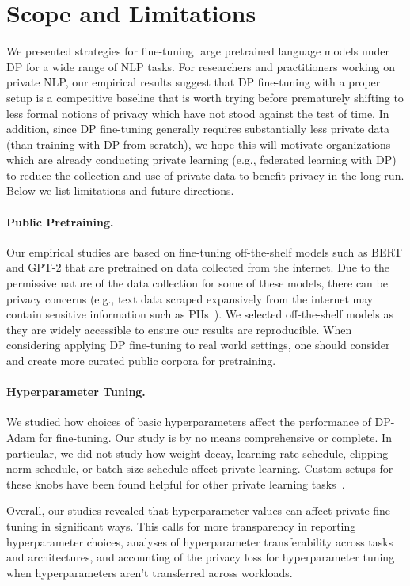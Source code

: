
\section{Scope and Limitations}

We presented strategies for fine-tuning large pretrained language models under DP for a wide range of NLP tasks. 
For researchers and practitioners working on private NLP, our empirical results suggest that DP fine-tuning with a proper setup is a competitive baseline that is worth trying before prematurely shifting to less formal notions of privacy which have not stood against the test of time.
In addition, since DP fine-tuning generally requires substantially less private data (than training with DP from scratch), we hope this will motivate organizations which are already conducting private learning (e.g., federated learning with DP) to reduce the collection and use of private data to benefit privacy in the long run.
Below we list limitations and future directions. 

\paragraph{Public Pretraining.}
Our empirical studies are based on fine-tuning off-the-shelf models such as BERT and GPT-2 that are pretrained on data collected from the internet. 
Due to the permissive nature of the data collection for some of these models, there can be privacy concerns (e.g., text data scraped expansively from the internet may contain sensitive information such as PIIs~\citep{carlini2020extracting}).
We selected off-the-shelf models as they are widely accessible to ensure our results are reproducible.
When considering applying DP fine-tuning to real world settings, one should consider and create more curated public corpora for pretraining.

\paragraph{Hyperparameter Tuning.}
We studied how choices of basic hyperparameters affect the performance of DP-Adam for fine-tuning.
Our study is by no means comprehensive or complete.
In particular, we did not study how weight decay, learning rate schedule, clipping norm schedule, or batch size schedule affect private learning. 
Custom setups for these knobs have been found helpful for other private learning tasks~\citep{anil2021large}. 

Overall, our studies revealed that hyperparameter values can affect private fine-tuning in significant ways.
This calls for more transparency in reporting hyperparameter choices, analyses of hyperparameter transferability across tasks and architectures, and accounting of the privacy loss for hyperparameter tuning when hyperparameters aren't transferred across workloads.

